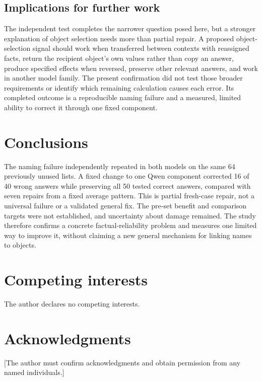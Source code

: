 \documentclass[10pt,letterpaper]{article}
\begin{document}
\subsection*{Implications for further work}

The independent test completes the narrower question posed here, but a stronger explanation of object selection needs more than partial repair. A proposed object-selection signal should work when transferred between contexts with reassigned facts, return the recipient object's own values rather than copy an answer, produce specified effects when reversed, preserve other relevant answers, and work in another model family. The present confirmation did not test those broader requirements or identify which remaining calculation causes each error. Its completed outcome is a reproducible naming failure and a measured, limited ability to correct it through one fixed component.


\section*{Conclusions}

The naming failure independently repeated in both models on the same 64 previously unused lists. A fixed change to one Qwen component corrected 16 of 40 wrong answers while preserving all 50 tested correct answers, compared with seven repairs from a fixed average pattern. This is partial fresh-case repair, not a universal failure or a validated general fix. The pre-set benefit and comparison targets were not established, and uncertainty about damage remained. The study therefore confirms a concrete factual-reliability problem and measures one limited way to improve it, without claiming a new general mechanism for linking names to objects.


\section*{Competing interests}

The author declares no competing interests.


\section*{Acknowledgments}

[The author must confirm acknowledgments and obtain permission from any named individuals.]


\nolinenumbers
\end{document}
